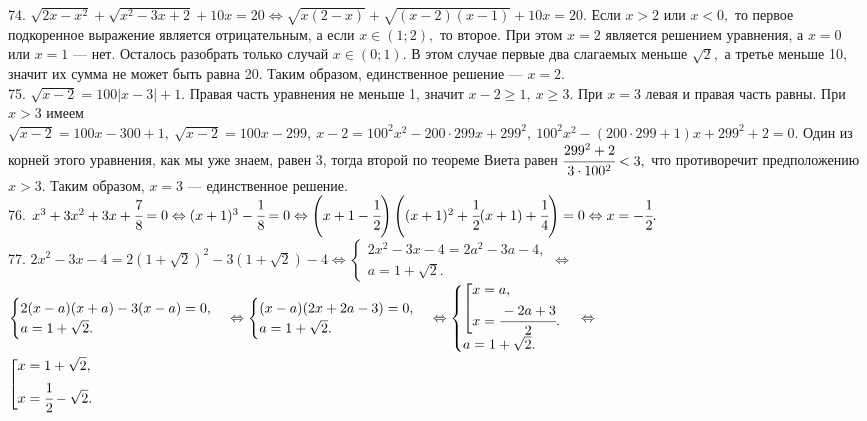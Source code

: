 74. $\sqrt{2x-x^2}+\sqrt{x^2-3x+2}+10x=20\Leftrightarrow \sqrt{x(2-x)}+\sqrt{(x-2)(x-1)}+10x=20.$ Если $x>2$ или $x<0,$ то первое подкоренное выражение является отрицательным, а если $x\in (1;2),$ то второе. При этом $x=2$ является решением уравнения, а  $x=0$ или $x=1$ --- нет. Осталось разобрать только случай $x\in(0;1).$ В этом случае первые два слагаемых меньше $\sqrt{2},$ а третье меньше 10, значит их сумма не может быть равна 20. Таким образом, единственное решение --- $x=2.$\\
75. $\sqrt{x-2}=100|x-3|+1.$ Правая часть уравнения не меньше 1, значит  $x-2\geqslant1,\ x\geqslant3.$ При $x=3$ левая и правая часть равны. При $x>3$ имеем
$\sqrt{x-2}=100x-300+1,\ \sqrt{x-2}=100x-299,\ x-2=100^2x^2-200\cdot299x+299^2,\ 100^2x^2-(200\cdot299+1)x+299^2+2=0.$ Один из корней этого уравнения, как мы уже знаем, равен 3, тогда второй по теореме Виета равен $\cfrac{299^2+2}{3\cdot100^2}<3,$ что противоречит предположению $x>3.$ Таким образом, $x=3$ --- единственное решение.\\
76. $x^3+3x^2+3x+\cfrac{7}{8}=0 \Leftrightarrow (x+1)^3-\cfrac{1}{8}=0\Leftrightarrow \left(x+1-\cfrac{1}{2}\right)\left((x+1)^2+\cfrac{1}{2}(x+1)+\cfrac{1}{4}\right)=0\Leftrightarrow x=-\cfrac{1}{2}.$\\
77. $2x^2-3x-4=2(1+\sqrt{2})^2-3(1+\sqrt{2})-4\Leftrightarrow\begin{cases}2x^2-3x-4=2a^2-3a-4,\\ a=1+\sqrt{2}.\end{cases}
\Leftrightarrow$\\$\begin{cases}2(x-a)(x+a)-3(x-a)=0,\\ a=1+\sqrt{2}.\end{cases}
\Leftrightarrow\begin{cases}(x-a)(2x+2a-3)=0,\\ a=1+\sqrt{2}.\end{cases}
\Leftrightarrow \begin{cases}\left[\begin{gathered}
     x=a,\hfill\\
     x=\cfrac{-2a+3}{2}.\hfill \end{gathered}\right.\\ a=1+\sqrt{2}.\end{cases}\Leftrightarrow$\\$
\left[\begin{gathered}
     x=1+\sqrt{2},\hfill\\
     x=\cfrac{1}{2}-\sqrt{2}.\hfill \end{gathered}\right.$\\
